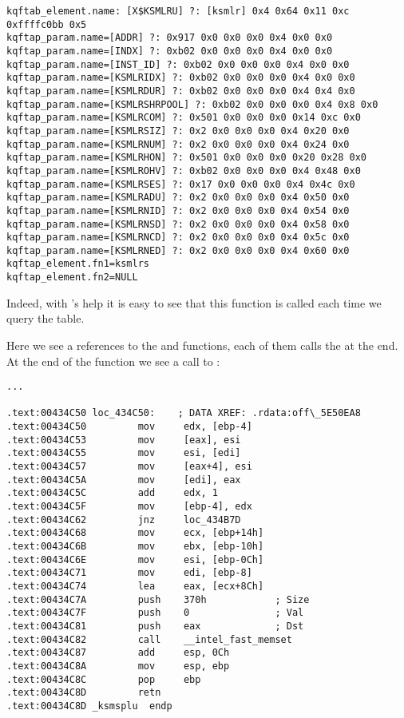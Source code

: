 \begin{lstlisting}[caption=Result of \OracleTablesName]
kqftab_element.name: [X$KSMLRU] ?: [ksmlr] 0x4 0x64 0x11 0xc 0xffffc0bb 0x5
kqftap_param.name=[ADDR] ?: 0x917 0x0 0x0 0x0 0x4 0x0 0x0
kqftap_param.name=[INDX] ?: 0xb02 0x0 0x0 0x0 0x4 0x0 0x0
kqftap_param.name=[INST_ID] ?: 0xb02 0x0 0x0 0x0 0x4 0x0 0x0
kqftap_param.name=[KSMLRIDX] ?: 0xb02 0x0 0x0 0x0 0x4 0x0 0x0
kqftap_param.name=[KSMLRDUR] ?: 0xb02 0x0 0x0 0x0 0x4 0x4 0x0
kqftap_param.name=[KSMLRSHRPOOL] ?: 0xb02 0x0 0x0 0x0 0x4 0x8 0x0
kqftap_param.name=[KSMLRCOM] ?: 0x501 0x0 0x0 0x0 0x14 0xc 0x0
kqftap_param.name=[KSMLRSIZ] ?: 0x2 0x0 0x0 0x0 0x4 0x20 0x0
kqftap_param.name=[KSMLRNUM] ?: 0x2 0x0 0x0 0x0 0x4 0x24 0x0
kqftap_param.name=[KSMLRHON] ?: 0x501 0x0 0x0 0x0 0x20 0x28 0x0
kqftap_param.name=[KSMLROHV] ?: 0xb02 0x0 0x0 0x0 0x4 0x48 0x0
kqftap_param.name=[KSMLRSES] ?: 0x17 0x0 0x0 0x0 0x4 0x4c 0x0
kqftap_param.name=[KSMLRADU] ?: 0x2 0x0 0x0 0x0 0x4 0x50 0x0
kqftap_param.name=[KSMLRNID] ?: 0x2 0x0 0x0 0x0 0x4 0x54 0x0
kqftap_param.name=[KSMLRNSD] ?: 0x2 0x0 0x0 0x0 0x4 0x58 0x0
kqftap_param.name=[KSMLRNCD] ?: 0x2 0x0 0x0 0x0 0x4 0x5c 0x0
kqftap_param.name=[KSMLRNED] ?: 0x2 0x0 0x0 0x0 0x4 0x60 0x0
kqftap_element.fn1=ksmlrs
kqftap_element.fn2=NULL
\end{lstlisting}

Indeed, with \tracer's help it is easy to see that this function is called each 
time we query the  table.

Here we see a references to the  and  functions, each of 
them calls the  at the end.
At the end of the  function we see 
a call to :

\begin{lstlisting}[caption=ksm.o,style=customasmx86]
...

.text:00434C50 loc_434C50:    ; DATA XREF: .rdata:off\_5E50EA8
.text:00434C50         mov     edx, [ebp-4]
.text:00434C53         mov     [eax], esi
.text:00434C55         mov     esi, [edi]
.text:00434C57         mov     [eax+4], esi
.text:00434C5A         mov     [edi], eax
.text:00434C5C         add     edx, 1
.text:00434C5F         mov     [ebp-4], edx
.text:00434C62         jnz     loc_434B7D
.text:00434C68         mov     ecx, [ebp+14h]
.text:00434C6B         mov     ebx, [ebp-10h]
.text:00434C6E         mov     esi, [ebp-0Ch]
.text:00434C71         mov     edi, [ebp-8]
.text:00434C74         lea     eax, [ecx+8Ch]
.text:00434C7A         push    370h            ; Size
.text:00434C7F         push    0               ; Val
.text:00434C81         push    eax             ; Dst
.text:00434C82         call    __intel_fast_memset
.text:00434C87         add     esp, 0Ch
.text:00434C8A         mov     esp, ebp
.text:00434C8C         pop     ebp
.text:00434C8D         retn
.text:00434C8D _ksmsplu  endp
\end{lstlisting}

